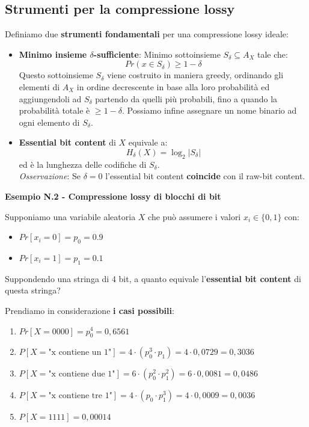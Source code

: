 \subsection{Strumenti per la compressione lossy}
Definiamo due \textbf{strumenti fondamentali} per una compressione lossy ideale:
\begin{itemize}
	\item \textbf{Minimo insieme $\delta$-sufficiente}: Minimo sottoinsieme $S_\delta \subseteq A_X$ tale che:
	\begin{equation}
		Pr(x \in S_\delta) \geq 1 - \delta
	\end{equation}
	Questo sottoinsieme $S_\delta$ viene costruito in maniera greedy, ordinando gli elementi di $A_X$ in ordine decrescente in base alla loro probabilità ed aggiungendoli ad $S_\delta$ partendo da quelli più probabili, fino a quando la probabilità totale è $\geq 1 - \delta$. Possiamo infine assegnare un nome binario ad ogni elemento di $S_\delta$.
	
	\item \textbf{Essential bit content} di $X$ equivale a:
	\begin{equation}
		H_\delta(X) = \log_{2} |S_\delta|
	\end{equation}
	ed è la lunghezza delle codifiche di $S_\delta$.\\
	\textit{Osservazione}: Se $\delta=0$ l'essential bit content \textbf{coincide} con il raw-bit content.
\end{itemize}


\textbf{Esempio N.2 - Compressione lossy di blocchi di bit}

Supponiamo una variabile aleatoria $X$ che può assumere i valori
$x_i \in \{0,1\}$ con:
\begin{itemize}
	\item $Pr[x_i = 0] = p_0 = 0.9$
	\item $Pr[x_i = 1] = p_1 = 0.1$
\end{itemize}

Suppondendo una stringa di 4 bit, a quanto equivale l'\textbf{essential bit content} di questa stringa?

Prendiamo in considerazione \textbf{i casi possibili}:
\begin{enumerate}
	\item $Pr[X=0000]= p_0^4 = 0,6561$
	\item $P[X=\text{"x contiene un 1"}] = 4 \cdot (p_0^3\cdot p_1) = 4 \cdot 0,0729 = 0,3036$
	\item $P[X=\text{"x contiene due 1"}]= 6 \cdot (p_0^2 \cdot p_1^2) = 6\cdot 0,0081 = 0,0486$
	\item $P[X=\text{"x contiene tre 1"}]= 4 \cdot (p_0 \cdot p_1^3) = 4 \cdot 0,0009 = 0,0036$
	\item $P[X=1111]=0,00014$
\end{enumerate}

